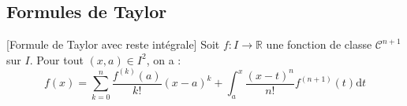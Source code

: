 \documentclass[french,11pt,twoside]{VcCours}
\newcommand{\dx}{\text{d}x}
\newcommand{\dt}{\text{d}t}
\newcommand{\Int}[2]{\int_{#1}^{#2}}
\begin{document}
%
%

\subsection{Formules de Taylor}


\begin{Theoreme}{}[Formule de Taylor avec reste intégrale] Soit $f : I \rightarrow \mathbb{R}$ une fonction de classe $\mathcal{C}^{n+1}$ sur $I$. Pour tout $(x,a) \in I^2$, on a :
$$ f(x) = \sum_{k=0}^n \frac{f^{(k)}(a)}{k!}(x-a)^k + \int_{a}^x \frac{(x-t)^n}{n!} f^{(n+1)}(t) \dt$$
\end{Theoreme}
\end{document}
